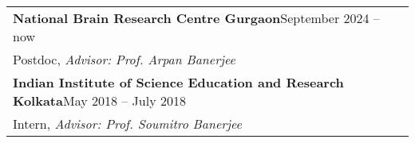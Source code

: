 

\noindent
\begin{tabular}{@{} m{18.5cm}}
\textbf{National Brain Research Centre Gurgaon}\hfill September 2024 -- now\\
Postdoc, \textit{Advisor: Prof. Arpan Banerjee}\\[0.3cm]

\textbf{Indian Institute of Science Education and Research Kolkata}\hfill May 2018 -- July 2018 \\
Intern, \textit{Advisor: Prof. Soumitro Banerjee}\\
\end{tabular}